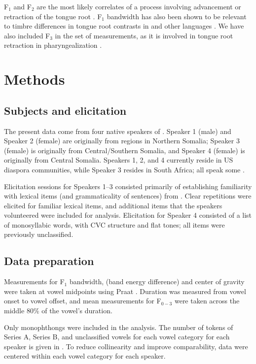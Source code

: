 \documentclass[output=paper,newtxmath,modfonts,nonflat,hidelinks]{langsci/langscibook}
\begin{document}
F$_1$ and F$_2$ are the most likely correlates of a process involving advancement or retraction of the tongue root \citep{Starwalt2008}.  F$_1$ bandwidth has also been shown to be relevant to timbre differences in tongue root contrasts in  \citep{Hess1992} and other languages \citep{Starwalt2008}.  We have also included F$_3$ in the set of measurements, as it is involved in tongue root retraction in  pharyngealization \citet{Ghazeli1977}.

\section{Methods}
\label{methods}

\subsection{Subjects and elicitation}

The present data come from four native speakers of .  Speaker 1 (male) and Speaker 2 (female) are originally from regions in Northern Somalia; Speaker 3 (female) is originally from Central/Southern Somalia, and Speaker 4 (female) is originally from Central Somalia.  Speakers 1, 2, and 4 currently reside in US diaspora communities, while Speaker 3 resides in South Africa; all speak some .

Elicitation sessions for Speakers 1--3 consisted primarily of establishing familiarity with lexical items (and grammaticality of sentences) from \cite{Andrzejewski1955}.  Clear repetitions were elicited for familiar lexical items, and additional items that the speakers volunteered were included for analysis.  Elicitation for Speaker 4 consisted of a list of monosyllabic words, with CVC structure and flat tones; all items were previously unclassified.

\subsection{Data preparation}


Measurements for F$_1$ bandwidth,  (band energy difference) and center of gravity were taken at vowel midpoints using Praat \citep{praat}.  Duration was measured from vowel onset to vowel offset, and mean measurements for F$_{0-3}$ were taken across the middle 80\% of the vowel's duration.

Only monophthongs were included in the  analysis.  The number of tokens of Series A, Series B, and unclassified vowels for each vowel category for each speaker is given in .  To reduce collinearity and improve comparability, data were centered within each vowel category for each speaker.
\end{document}
